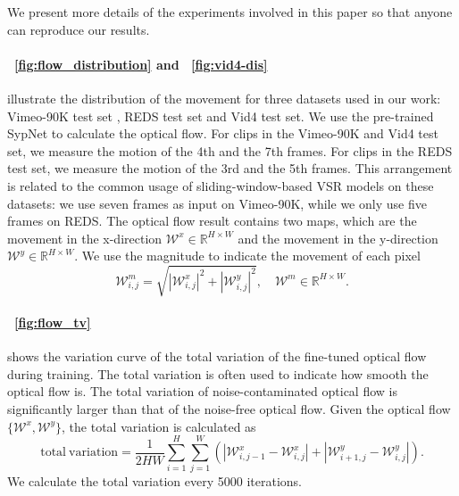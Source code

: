 \documentclass{article}
\begin{document}
We present more details of the experiments involved in this paper so that anyone can reproduce our results.

\vspace{-3mm}
\paragraph{\figurename~\ref{fig:flow_distribution} and \figurename~\ref{fig:vid4-dis}}
illustrate the distribution of the movement for three datasets used in our work: Vimeo-90K test set \cite{xue2019video}, REDS \cite{nah2019ntire} test set and Vid4 \cite{liu2013bayesian} test set.
We use the pre-trained SypNet \cite{ranjan2017optical} to calculate the optical flow.
For clips in the Vimeo-90K and Vid4 test set, we measure the motion of the 4th and the 7th frames.
For clips in the REDS test set, we measure the motion of the 3rd and the 5th frames.
This arrangement is related to the common usage of sliding-window-based VSR models on these datasets: we use seven frames as input on Vimeo-90K, while we only use five frames on REDS.
The optical flow result contains two maps, which are the movement in the x-direction $\mathcal{W}^x\in\mathbb{R}^{H\times W}$ and the movement in the y-direction $\mathcal{W}^y\in\mathbb{R}^{H\times W}$.
We use the magnitude to indicate the movement of each pixel
$$\mathcal{W}^m_{i,j}=\sqrt{|\mathcal{W}^x_{i,j}|^2+|\mathcal{W}^y_{i,j}|^2},\quad\mathcal{W}^m\in\mathbb{R}^{H\times W}.$$

\vspace{-3mm}
\paragraph{\figurename~\ref{fig:flow_tv}}
shows the variation curve of the total variation of the fine-tuned optical flow during training.
The total variation is often used to indicate how smooth the optical flow is.
The total variation of noise-contaminated optical flow is significantly larger than that of the noise-free optical flow.
Given the optical flow $\{\mathcal{W}^x,\mathcal{W}^y\}$, the total variation is calculated as
$$\mathrm{total\ variation}=\frac{1}{2HW}\sum_{i=1}^{H}\sum_{j=1}^W(|\mathcal{W}^x_{i,j-1}-\mathcal{W}^x_{i,j}|+|\mathcal{W}^y_{i+1,j}-\mathcal{W}^y_{i,j}|).$$
We calculate the total variation every 5000 iterations.

\vspace{-3mm}
\end{document}
